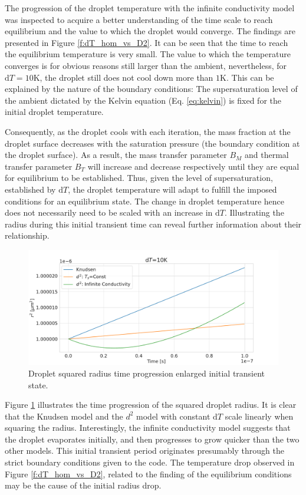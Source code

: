 \documentclass[12pt]{article}
\numberwithin{equation}{section}
\begin{document}
The progression of the droplet temperature with the infinite conductivity model was inspected to acquire a better understanding of the time scale to reach equilibrium and the value to which the droplet would converge. The findings are presented in Figure \ref{f:dT_hom_vs_D2}. It can be seen that the time to reach the equilibrium temperature is very small. The value to which the temperature converges is for obvious reasons still larger than the ambient, nevertheless, for $\mathrm{d}T=10\mathrm{K}$, the droplet still does not cool down more than $1\mathrm{K}$. This can be explained by the nature of the boundary conditions:  The supersaturation level of the ambient dictated by the Kelvin equation (Eq. \ref{eq:kelvin}) is fixed for the initial droplet temperature.  

Consequently, as the droplet cools with each iteration, the mass fraction at the droplet surface decreases with the saturation pressure (the boundary condition at the droplet surface). As a result, the mass transfer parameter $B_{M}$ and thermal transfer parameter $B_{T}$ will increase and decrease respectively until they are equal for equilibrium to be established. Thus, given the level of supersaturation, established by $\mathrm{d}T$, the droplet temperature will adapt to fulfill the imposed conditions for an equilibrium state. The change in droplet temperature hence does not necessarily need to be scaled with an increase in $\mathrm{d}T$. Illustrating the radius during this initial transient time can reveal further information about their relationship.
\begin{figure}[H]
    \centering
    \includegraphics[trim={0 0 0 30},clip,width=1.0\textwidth]{Figures/r_sq_transient_initial.pdf}
    \caption{Droplet squared radius time progression enlarged initial transient state.}
    \label{f:transient_hom_vs_D2}
\end{figure}
Figure \ref{f:transient_hom_vs_D2} illustrates the time progression of the squared droplet radius. It is clear that the Knudsen model and the $d^{2}$ model with constant $\mathrm{d}T$ scale linearly when squaring the radius. Interestingly, the infinite conductivity model suggests that the droplet evaporates initially, and then progresses to grow quicker than the two other models. This initial transient period originates presumably through the strict boundary conditions given to the code. The temperature drop observed in Figure \ref{f:dT_hom_vs_D2}, related to the finding of the equilibrium conditions may be the cause of the initial radius drop.
\end{document}
